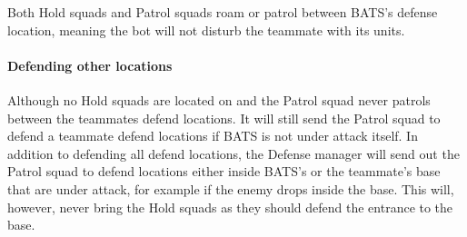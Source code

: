 Both Hold squads and Patrol squads roam or patrol between BATS’s defense location, meaning the bot
will not disturb the teammate with its units.

\paragraph{Defending other locations}
Although no Hold squads are located on and the Patrol squad never patrols between the teammates
defend locations. It will still send the Patrol squad to defend a teammate defend locations if BATS
is not under attack itself. In addition to defending all defend locations, the Defense manager will
send out the Patrol squad to defend locations either inside BATS’s or the teammate's base that are
under attack, for example if the enemy drops inside the base. This will, however, never bring the
Hold squads as they should defend the entrance to the base.
